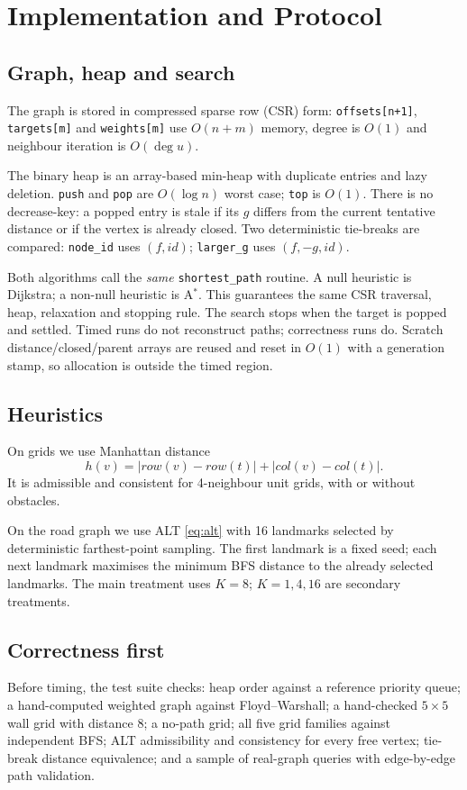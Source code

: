 \documentclass[conference,10pt]{IEEEtran}
\newcommand{\Astar}{A$^\ast$}
\newcommand{\code}[1]{\texttt{#1}}
\begin{document}
\section{Implementation and Protocol}
\label{sec:method}

\subsection{Graph, heap and search}
The graph is stored in compressed sparse row (CSR) form: \code{offsets[n+1]},
\code{targets[m]} and \code{weights[m]} use $O(n+m)$ memory, degree is $O(1)$
and neighbour iteration is $O(\deg u)$.

The binary heap is an array-based min-heap with duplicate entries and lazy
deletion.  \code{push} and \code{pop} are $O(\log n)$ worst case; \code{top} is
$O(1)$.  There is no decrease-key: a popped entry is stale if its $g$ differs
from the current tentative distance or if the vertex is already closed.  Two
deterministic tie-breaks are compared:
\code{node\_id} uses $(f,\mathit{id})$; \code{larger\_g} uses $(f,-g,\mathit{id})$.

Both algorithms call the \emph{same} \code{shortest\_path} routine.  A null
heuristic is Dijkstra; a non-null heuristic is \Astar{}.  This guarantees the
same CSR traversal, heap, relaxation and stopping rule.  The search stops when
the target is popped and settled.  Timed runs do not reconstruct paths;
correctness runs do.  Scratch distance/closed/parent arrays are reused and reset
in $O(1)$ with a generation stamp, so allocation is outside the timed region.

\subsection{Heuristics}
On grids we use Manhattan distance
\begin{equation}
  h(v)=|\mathit{row}(v)-\mathit{row}(t)|+|\mathit{col}(v)-\mathit{col}(t)|.
\end{equation}
It is admissible and consistent for 4-neighbour unit grids, with or without
obstacles.

On the road graph we use ALT \eqref{eq:alt} with 16 landmarks selected by
deterministic farthest-point sampling.  The first landmark is a fixed seed;
each next landmark maximises the minimum BFS distance to the already selected
landmarks.  The main treatment uses $K=8$; $K=1,4,16$ are secondary treatments.

\subsection{Correctness first}
Before timing, the test suite checks: heap order against a reference priority
queue; a hand-computed weighted graph against Floyd--Warshall; a hand-checked
$5\times5$ wall grid with distance 8; a no-path grid; all five grid families
against independent BFS; ALT admissibility and consistency for every free
vertex; tie-break distance equivalence; and a sample of real-graph queries with
edge-by-edge path validation.
\end{document}
